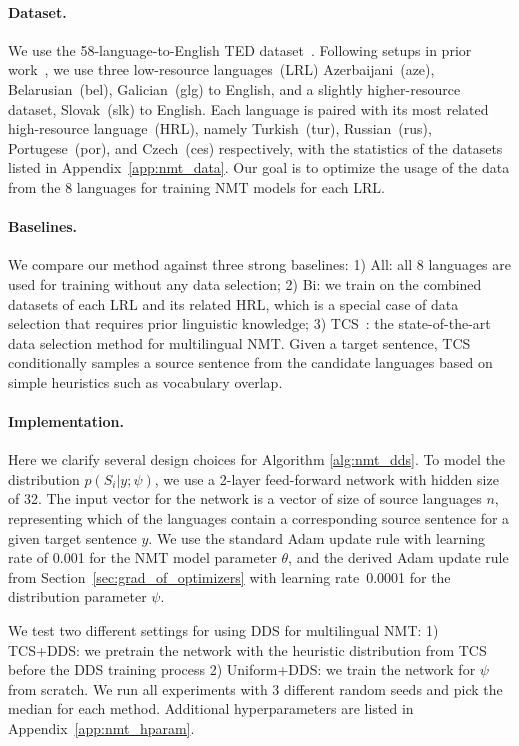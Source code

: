 \paragraph{Dataset.}
We use the 58-language-to-English TED dataset~\citep{ted_pretrain_emb}. 
Following setups in prior work~\citep{ted_pretrain_emb,rapid_adapt_nmt,SDE}, we use three low-resource languages~(LRL) Azerbaijani~(aze), Belarusian~(bel), Galician~(glg) to English,
and a slightly higher-resource dataset, Slovak~(slk) to English. Each language is paired with its most related high-resource language~(HRL), namely Turkish~(tur), Russian~(rus), Portugese~(por), and Czech~(ces) respectively, with the statistics of the datasets listed in Appendix~\ref{app:nmt_data}. Our goal is to optimize the usage of the data from the 8 languages for training NMT models for each LRL. 

\paragraph{Baselines.} We compare our method against three strong baselines: 1) All: all 8 languages are used for training without any data selection; 2) Bi: we train on the combined datasets of each LRL and its related HRL, which is a special case of data selection that requires prior linguistic knowledge; 3) TCS~\citep{TCS}: the state-of-the-art data selection method for multilingual NMT. Given a target sentence, TCS conditionally samples a source sentence from the candidate languages based on simple heuristics such as vocabulary overlap.

\paragraph{Implementation.} Here we clarify several design choices for Algorithm \ref{alg:nmt_dds}. To model the distribution $p(S_i|y;\psi)$, we use a 2-layer feed-forward network with hidden size of 32. The input vector for the network is a vector of size of source languages $n$, representing which of the languages contain a corresponding source sentence for a given target sentence $y$. We use the standard Adam update rule with learning rate of 0.001 for the NMT model parameter $\theta$, and the derived Adam update rule from Section~\ref{sec:grad_of_optimizers} with learning rate~0.0001 for the distribution parameter $\psi$. 

We test two different settings for using DDS for multilingual  NMT: 1) TCS+DDS: we pretrain the network with the heuristic distribution from TCS before the DDS training process
2) Uniform+DDS: we train the network for $\psi$ from scratch. %
We run all experiments with 3 different random seeds and pick the median for each method. Additional hyperparameters are listed in Appendix~\ref{app:nmt_hparam}.

